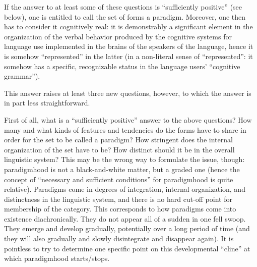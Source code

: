 \documentclass[output=paper]{langsci/langscibook}
\begin{document}
If the answer to at least some of these questions is “sufficiently positive” (see below), one is entitled to call the set of forms a paradigm. Moreover, one then has to consider it cognitively real: it is demonstrably a significant element in the organization of the verbal behavior produced by the cognitive systems for language use implemented in the brains of the speakers of the language, hence it is somehow “represented” in the latter (in a non-literal sense of “represented”: it somehow has a specific, recognizable status in the language users’ “cognitive grammar”).

This answer raises at least three new questions, however, to which the answer is in part less straightforward.

First of all, what is a “sufficiently positive” answer to the above questions? How many and what kinds of features and tendencies do the forms have to share in order for the set to be called a paradigm? How stringent does the internal organization of the set have to be? How distinct should it be in the overall linguistic system? This may be the wrong way to formulate the issue, though: paradigmhood is not a black-and-white matter, but a graded one (hence the concept of “necessary and sufficient conditions” for paradigmhood is quite relative). Paradigms come in degrees of integration, internal organization, and distinctness in the linguistic system, and there is no hard cut-off point for membership of the category. This corresponds to how paradigms come into existence diachronically. They do not appear all of a sudden in one fell swoop. They emerge and develop gradually, potentially over a long period of time (and they will also gradually and slowly disintegrate and disappear again). It is pointless to try to determine one specific point on this developmental “cline” at which paradigmhood starts/stops.
\end{document}
